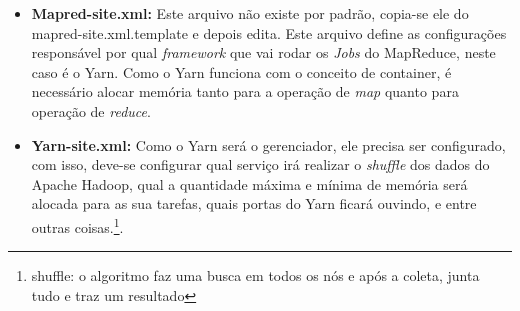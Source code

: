 \begin{itemize}
\item \textbf{Mapred-site.xml:} Este arquivo não existe por padrão, copia-se ele do mapred-site.xml.template e depois edita. Este arquivo define as configurações responsável por qual \textit{framework} que vai rodar os \textit{Jobs} do MapReduce, neste caso é o Yarn. Como o Yarn funciona com o conceito de container, é necessário alocar memória tanto para a operação de \textit{map} quanto para operação de \textit{reduce}.

\item \textbf{Yarn-site.xml:} Como o Yarn será o gerenciador, ele precisa ser configurado, com isso, deve-se configurar qual serviço irá realizar o \textit{shuffle} dos dados do Apache Hadoop, qual a quantidade máxima e mínima de memória será alocada para as sua tarefas, quais portas do Yarn ficará ouvindo, e entre outras coisas.\footnote{shuffle: o algoritmo faz uma busca em todos os nós e após a coleta, junta tudo e traz um resultado}. 

\end{itemize}
